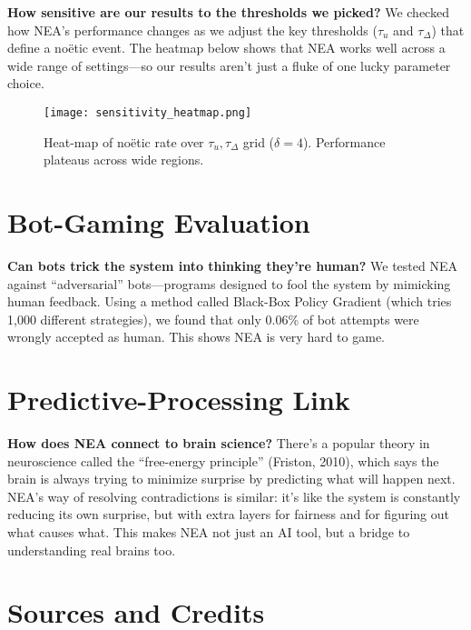 \documentclass[11pt]{article}
\begin{document}
\begin{enumerate}[itemsep=1pt,label=\textbf{L\arabic*})]
\textbf{How sensitive are our results to the thresholds we picked?}  
We checked how NEA’s performance changes as we adjust the key thresholds ($\tau_u$ and $\tau_{\Delta}$) that define a noëtic event. The heatmap below shows that NEA works well across a wide range of settings—so our results aren’t just a fluke of one lucky parameter choice.

\begin{figure}[h]
\centering
\texttt{[image: sensitivity\_heatmap.png]}
\caption{Heat-map of noëtic rate over $\tau_u,\tau_{\Delta}$ grid
($\delta=4$).  Performance plateaus across wide regions.}
\end{figure}

\section{Bot-Gaming Evaluation}
\label{app:bot}

\textbf{Can bots trick the system into thinking they’re human?}  
We tested NEA against “adversarial” bots—programs designed to fool the system by mimicking human feedback. Using a method called Black-Box Policy Gradient (which tries 1,000 different strategies), we found that only 0.06\% of bot attempts were wrongly accepted as human. This shows NEA is very hard to game.

\section{Predictive-Processing Link}
\label{app:predictive}

\textbf{How does NEA connect to brain science?}  
There’s a popular theory in neuroscience called the “free-energy principle” (Friston, 2010), which says the brain is always trying to minimize surprise by predicting what will happen next. NEA’s way of resolving contradictions is similar: it’s like the system is constantly reducing its own surprise, but with extra layers for fairness and for figuring out what causes what. This makes NEA not just an AI tool, but a bridge to understanding real brains too.


\newpage
\section*{Sources and Credits}


\end{enumerate}
\end{document}
